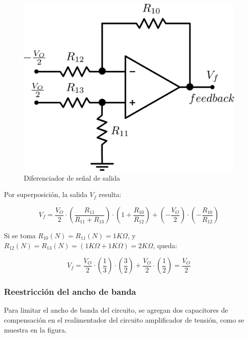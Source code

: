 \begin{figure}[!ht]
\begin{centering}
\includegraphics[scale=0.5]{Imagenes/Diferenciador.png}
\par\end{centering}
\caption{Diferenciador de señal de salida}
\end{figure}

Por superposición, la salida $V_f$ resulta:

\[
V_f = \frac{V_O}{2} \cdot \left( \frac{R_{11}}{R_{11} + R_{13}} \right) \cdot \left( 1 + \frac{R_{10}}{R_{12}} \right) + \left( -\frac{V_O}{2} \right) \cdot \left( -\frac{R_{10}}{R_{12}} \right)
\]

Si se toma $R_{10}(N) = R_{11}(N) = 1K\Omega$, y $R_{12}(N) = R_{13}(N) = (1K\Omega + 1K\Omega) = 2K\Omega$, queda:

\[
V_f = \frac{V_O}{2} \cdot \left( \frac{1}{3} \right) \cdot \left( \frac{3}{2} \right) + \frac{V_O}{2} \cdot \left( \frac{1}{2} \right) = \frac{V_O}{2}
\]

\newpage

\subsubsection{Reestricción del ancho de banda}

Para limitar el ancho de banda del circuito, se agregan dos capacitores de compensación en el realimentador del circuito amplificador de tensión, como se muestra en la figura.

